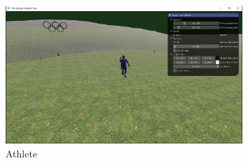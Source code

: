 \documentclass[a4 paper, 12pt]{article}
\begin{document}
    \begin{figure} [H]
        \centering
        \includegraphics[width=0.8\textwidth, frame]
            {./images/olympics/props_world.PNG}  
        \caption{Athlete}   
    \end{figure}
        
\end{document}
